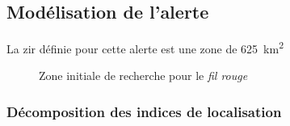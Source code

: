 


\subsection{Modélisation de l'alerte}
\label{subsec:9-4-2}

La \ac{zir} définie pour cette alerte est une zone de
\SI{625}{\kilo\meter\squared}

\begin{figure}
  \centering
  
  \caption{Zone initiale de recherche pour le \emph{fil rouge}}
  \label{fig:zir_fil_rouge}
\end{figure}

\subsubsection{Décomposition des indices de localisation}
\label{subsec:9-4-2-1}

